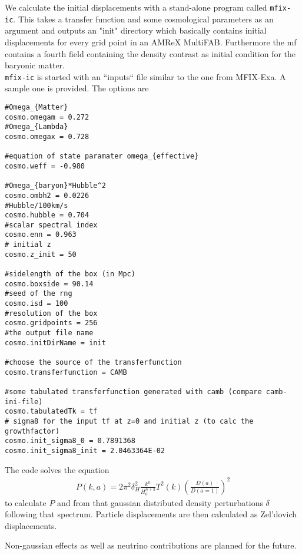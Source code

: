	We calculate the initial displacements with a stand-alone program called
	\texttt{mfix-ic}. This takes a transfer function and some cosmological parameters
	as an argument and outputs an "init" directory which basically contains initial
	displacements for every grid point in an AMReX MultiFAB. Furthermore the mf 
	contains a fourth field containing the density contrast as initial condition
	for the baryonic matter. \\
	\texttt{mfix-ic} is started with an ``inputs``
	file similar to the one from MFIX-Exa. A sample one is provided. The options are
\begin{verbatim}
#Omega_{Matter}
cosmo.omegam = 0.272
#Omega_{Lambda}
cosmo.omegax = 0.728

#equation of state paramater omega_{effective}
cosmo.weff = -0.980

#Omega_{baryon}*Hubble^2 
cosmo.ombh2 = 0.0226
#Hubble/100km/s
cosmo.hubble = 0.704
#scalar spectral index
cosmo.enn = 0.963
# initial z
cosmo.z_init = 50

#sidelength of the box (in Mpc)
cosmo.boxside = 90.14
#seed of the rng
cosmo.isd = 100
#resolution of the box
cosmo.gridpoints = 256
#the output file name
cosmo.initDirName = init

#choose the source of the transferfunction
cosmo.transferfunction = CAMB

#some tabulated transferfunction generated with camb (compare camb-ini-file)
cosmo.tabulatedTk = tf
# sigma8 for the input tf at z=0 and initial z (to calc the growthfactor)
cosmo.init_sigma8_0 = 0.7891368
cosmo.init_sigma8_init = 2.0463364E-02
\end{verbatim} 

	The code solves the equation
	\begin{align}
	P(k,a) = 2\pi^2\delta^2_H \frac{k^n}{H_0^{n+3}}T^2(k)\left( \frac{D(a)}{D(a=1)} \right)^2
	\end{align}
	to calculate $P$ and from that gaussian distributed density perturbations
	$\delta$ following that spectrum. Particle displacements are then calculated
	as Zel'dovich displacements.
	
	Non-gaussian effects as well as neutrino contributions are planned for the
	future.
	
